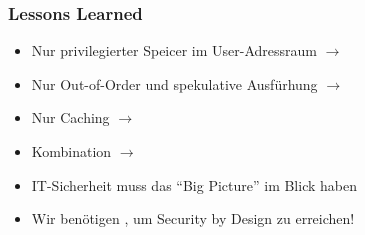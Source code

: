 \subsubsection*{Lessons Learned}
\begin{itemize}
    \item Nur privilegierter Speicer im User-Adressraum $\rightarrow$ 
    \item Nur Out-of-Order und spekulative Ausfürhung $\rightarrow$ 
    \item Nur Caching $\rightarrow$ 
    \item Kombination $\rightarrow$ 
\end{itemize}
\begin{itemize}
    \item IT-Sicherheit muss das \enquote{Big Picture} im Blick haben
    \item Wir benötigen , um Security by Design zu erreichen!
\end{itemize}